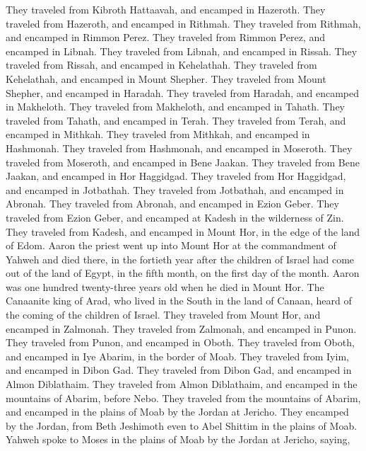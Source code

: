 {They traveled from Kibroth Hattaavah, and encamped in Hazeroth.
They traveled from Hazeroth, and encamped in Rithmah.
They traveled from Rithmah, and encamped in Rimmon Perez.
They traveled from Rimmon Perez, and encamped in Libnah.
They traveled from Libnah, and encamped in Rissah.
They traveled from Rissah, and encamped in Kehelathah.
They traveled from Kehelathah, and encamped in Mount Shepher.
They traveled from Mount Shepher, and encamped in Haradah.
They traveled from Haradah, and encamped in Makheloth.
They traveled from Makheloth, and encamped in Tahath.
They traveled from Tahath, and encamped in Terah.
They traveled from Terah, and encamped in Mithkah.
They traveled from Mithkah, and encamped in Hashmonah.
They traveled from Hashmonah, and encamped in Moseroth.
They traveled from Moseroth, and encamped in Bene Jaakan.
They traveled from Bene Jaakan, and encamped in Hor Haggidgad.
They traveled from Hor Haggidgad, and encamped in Jotbathah.
They traveled from Jotbathah, and encamped in Abronah.
They traveled from Abronah, and encamped in Ezion Geber.
They traveled from Ezion Geber, and encamped at Kadesh in the wilderness of Zin.
They traveled from Kadesh, and encamped in Mount Hor, in the edge of the land of Edom.
Aaron the priest went up into Mount Hor at the commandment of Yahweh and died there, in the fortieth year after the children of Israel had come out of the land of Egypt, in the fifth month, on the first day of the month.
Aaron was one hundred twenty-three years old when he died in Mount Hor.
The Canaanite king of Arad, who lived in the South in the land of Canaan, heard of the coming of the children of Israel.
They traveled from Mount Hor, and encamped in Zalmonah.
They traveled from Zalmonah, and encamped in Punon.
They traveled from Punon, and encamped in Oboth.
They traveled from Oboth, and encamped in Iye Abarim, in the border of Moab.
They traveled from Iyim, and encamped in Dibon Gad.
They traveled from Dibon Gad, and encamped in Almon Diblathaim.
They traveled from Almon Diblathaim, and encamped in the mountains of Abarim, before Nebo.
They traveled from the mountains of Abarim, and encamped in the plains of Moab by the Jordan at Jericho.
They encamped by the Jordan, from Beth Jeshimoth even to Abel Shittim in the plains of Moab.
Yahweh spoke to Moses in the plains of Moab by the Jordan at Jericho, saying,
}
